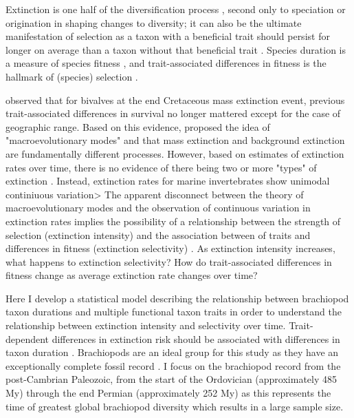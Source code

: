 \documentclass[11pt]{article}
\begin{document}
Extinction is one half of the diversification process \citep{Raup1994,Stanley1979,Stanley1975}, second only to speciation or origination in shaping changes to diversity; it can also be the ultimate manifestation of selection as a taxon with a beneficial trait should persist for longer on average than a taxon without that beneficial trait \citep{Jablonski2008a,Rabosky2010b,Raup1994,Stanley1975}. Species duration is a measure of species fitness \citep{Cooper1984}, and trait-associated differences in fitness is the hallmark of (species) selection \citep{Rabosky2010b}.

\citet{Jablonski1986} observed that for bivalves at the end Cretaceous mass extinction event, previous trait-associated differences in survival no longer mattered except for the case of geographic range. Based on this evidence, \citet{Jablonski1986} proposed the idea of "macroevolutionary modes" and that mass extinction and background extinction are fundamentally different processes. However, based on estimates of extinction rates over time, there is no evidence of there being two or more "types" of extinction \citep{Wang2003}. Instead, extinction rates for marine invertebrates show unimodal continiuous variation> The apparent disconnect between the theory of macroevolutionary modes and the observation of continuous variation in extinction rates implies the possibility of a relationship between the strength of selection (extinction intensity) and the association between of traits and differences in fitness (extinction selectivity) \citep{Payne2016}. As extinction intensity increases, what happens to extinction selectivity? How do trait-associated differences in fitness change as average extinction rate changes over time?

Here I develop a statistical model describing the relationship between brachiopod taxon durations and multiple functional taxon traits in order to understand the relationship between extinction intensity and selectivity over time. Trait-dependent differences in extinction risk should be associated with differences in taxon duration \citep{Cooper1984,Rabosky2010b}. Brachiopods are an ideal group for this study as they have an exceptionally complete fossil record \citep{Foote1996e,Foote2000a}. I focus on the brachiopod record from the post-Cambrian Paleozoic, from the start of the Ordovician (approximately 485 My) through the end Permian (approximately 252 My) as this represents the time of greatest global brachiopod diversity \citep{Alroy2010} which results in a large sample size.
\end{document}
